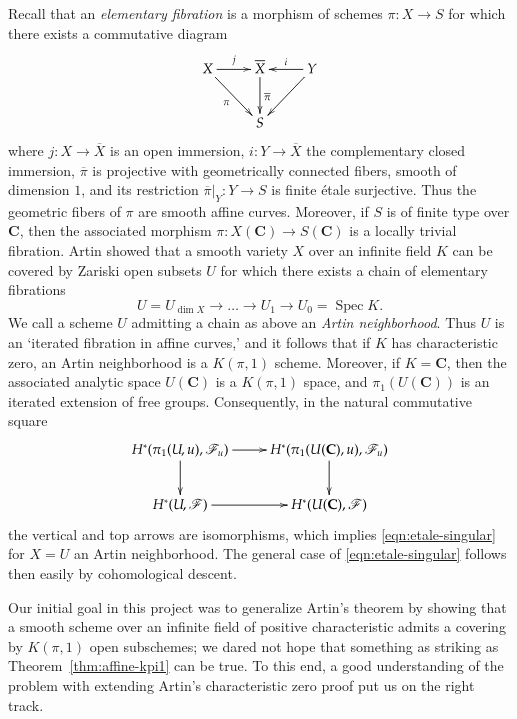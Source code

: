 \documentclass[twoside]{amsart}
\newcommand{\CC}{\mathbf{C}}
\newcommand{\Ff}{\mathscr{F}}
\DeclareMathOperator{\Spec}{Spec}
\renewcommand{\to}{\longrightarrow}
\renewcommand{\bar}{\overline}
\theoremstyle{plain}
\theoremstyle{definition}
\theoremstyle{remark}
\numberwithin{equation}{subsection}
\begin{document}
Recall that an \emph{elementary fibration} is a morphism of schemes $\pi\colon X\to S$ for which there exists a commutative diagram
\[ 
	\xymatrix{
		X \ar[dr]_\pi \ar[r]^j & \bar X \ar[d]^{\bar \pi} & Y \ar[dl] \ar[l]_i \\
		& S &
	}
\] 
where $j\colon X\to \bar X$ is an open immersion, $i\colon Y\to \bar X$ the complementary closed immersion, $\bar \pi$ is projective with geometrically connected fibers, smooth of dimension $1$, and its restriction $\bar \pi|_Y \colon Y\to S$ is finite \'etale surjective. Thus the geometric fibers of $\pi$ are smooth affine curves. Moreover, if $S$ is of finite type over $\CC$, then the associated morphism $\pi\colon X(\CC)\to S(\CC)$ is a locally trivial fibration. Artin showed that a smooth variety $X$ over an infinite field $K$ can be covered by Zariski open subsets $U$ for which there exists a chain of elementary fibrations
\[ 
	U = U_{\dim X} \to \ldots \to U_1 \to U_0 = \Spec K.
\]
We call a scheme $U$ admitting a chain as above an \emph{Artin neighborhood}. Thus $U$ is an `iterated fibration in affine curves,' and it follows that if $K$ has characteristic zero, an Artin neighborhood is a $K(\pi, 1)$ scheme. Moreover, if $K=\CC$, then the associated analytic space $U(\CC)$ is a $K(\pi, 1)$ space, and $\pi_1(U(\CC))$ is an iterated extension of free groups. Consequently, in the natural commutative square
\[ 
	\xymatrix{
		H^*(\pi_1(U,u), \Ff_{u}) \ar[r] \ar[d] & H^*(\pi_1(U(\CC), u), \Ff_u) \ar[d] \\
		H^*(U, \Ff) \ar[r] & H^*(U(\CC), \Ff)
	}
\]
the vertical and top arrows are isomorphisms, which implies \eqref{eqn:etale-singular} for $X=U$ an Artin neighborhood. The general case of \eqref{eqn:etale-singular} follows then easily by cohomological descent.

Our initial goal in this project was to generalize Artin's theorem by showing that a smooth scheme over an infinite field of positive characteristic admits a covering by $K(\pi, 1)$ open subschemes; we dared not hope that something as striking as Theorem~\ref{thm:affine-kpi1} can be true. To this end, a good understanding of the problem with extending Artin's characteristic zero proof put us on the right track.
\end{document}
